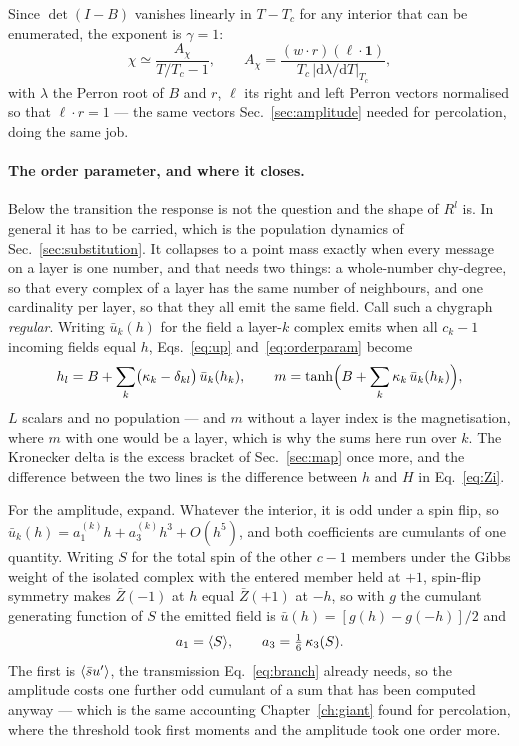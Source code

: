 Since $\det(I-B)$ vanishes linearly in $T-T_{c}$ for any interior that can be
enumerated, the exponent is $\gamma=1$:
\begin{equation}
  \chi\simeq\frac{A_{\chi}}{T/T_{c}-1},
  \qquad
  A_{\chi}=\frac{(w\cdot r)(\ell\cdot\mathbf{1})}
                {T_{c}\,\bigl|\mathrm{d}\lambda/\mathrm{d}T\bigr|_{T_{c}}},
  \label{eq:chiamp}
\end{equation}
with $\lambda$ the Perron root of $B$ and $r$, $\ell$ its right and left Perron
vectors normalised so that $\ell\cdot r=1$ --- the same vectors
Sec.~\ref{sec:amplitude} needed for percolation, doing the same job.

\paragraph{The order parameter, and where it closes.} Below the transition the
response is not the question and the shape of $R^{l}$ is. In general it has to
be carried, which is the population dynamics of Sec.~\ref{sec:substitution}. It
collapses to a point mass exactly when every message on a layer is one number,
and that needs two things: a whole-number chy-degree, so that every complex of
a layer has the same number of neighbours, and one cardinality per layer, so
that they all emit the same field. Call such a chygraph \emph{regular}. Writing
$\bar u_{k}(h)$ for the field a layer-$k$ complex emits when all $c_{k}-1$
incoming fields equal $h$, Eqs.~\eqref{eq:up} and~\eqref{eq:orderparam} become
\begin{equation}
  h_{l}=B+\sum_{k}\bigl(\kappa_{k}-\delta_{kl}\bigr)\,\bar u_{k}(h_{k}),
  \qquad
  m=\tanh\Bigl(B+\sum_{k}\kappa_{k}\,\bar u_{k}(h_{k})\Bigr),
  \label{eq:magclosure}
\end{equation}
$L$ scalars and no population --- and $m$ without a layer index is the
magnetisation, where $m$ with one would be a layer, which is why the sums here
run over $k$. The Kronecker delta is the excess bracket of
Sec.~\ref{sec:map} once more, and the difference between the two lines is the
difference between $h$ and $H$ in Eq.~\eqref{eq:Zi}.

For the amplitude, expand. Whatever the interior, it is odd under a spin flip,
so $\bar u_{k}(h)=a^{(k)}_{1}h+a^{(k)}_{3}h^{3}+O(h^{5})$, and both
coefficients are cumulants of one quantity. Writing $S$ for the total spin of
the other $c-1$ members under the Gibbs weight of the isolated complex with the
entered member held at $+1$, spin-flip symmetry makes $\bar{Z}(-1)$ at $h$ equal
$\bar{Z}(+1)$ at $-h$, so with $g$ the cumulant generating function of $S$ the emitted
field is $\bar u(h)=[g(h)-g(-h)]/2$ and
\begin{equation}
  a_{1}=\langle S \rangle,
  \qquad
  a_{3}=\tfrac{1}{6}\,\kappa_{3}(S).
  \label{eq:a1a3}
\end{equation}
The first is $\langle \bar s u' \rangle$, the transmission Eq.~\eqref{eq:branch} already
needs, so the amplitude costs one further odd cumulant of a sum that has been
computed anyway --- which is the same accounting Chapter~\ref{ch:giant} found
for percolation, where the threshold took first moments and the amplitude took
one order more.

